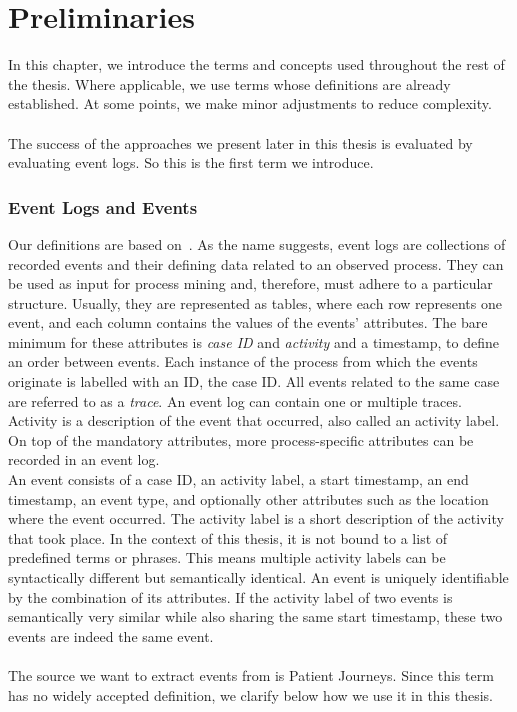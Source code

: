 
\section{Preliminaries}\label{sec:back}
In this chapter, we introduce the terms and concepts used throughout the rest of the thesis. Where applicable, we use terms whose definitions are already established. At some points, we make minor adjustments to reduce complexity.\\\\ 
The success of the approaches we present later in this thesis is evaluated by evaluating event logs. So this is the first term we introduce.
\subsubsection*{Event Logs and Events}\label{sec:event-log}
Our definitions are based on~\cite{van_der_aalst_process_2016}.
As the name suggests, event logs are collections of recorded events and their defining data related to an observed process. They can be used as input for process mining and, therefore, must adhere to a particular structure. Usually, they are represented as tables, where each row represents one event, and each column contains the values of the events' attributes. The bare minimum for these attributes is \emph{case ID} and \emph{activity} and a timestamp, to define an order between events. Each instance of the process from which the events originate is labelled with an ID, the case ID. All events related to the same case are referred to as a \emph{trace}.  An event log can contain one or multiple traces. Activity is a description of the event that occurred, also called an activity label. On top of the mandatory attributes, more process-specific attributes can be recorded in an event log.\\
An event consists of a case ID, an activity label, a start timestamp, an end timestamp, an event type, and optionally other attributes such as the location where the event occurred. The activity label is a short description of the activity that took place. In the context of this thesis, it is not bound to a list of predefined terms or phrases. This means multiple activity labels can be syntactically different but semantically identical. An event is uniquely identifiable by the combination of its attributes. If the activity label of two events is semantically very similar while also sharing the same start timestamp, these two events are indeed the same event.\\\\
The source we want to extract events from is Patient Journeys. Since this term has no widely accepted definition, we clarify below how we use it in this thesis.

